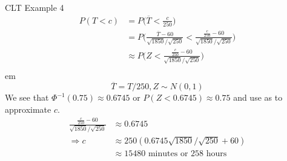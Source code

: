 \documentclass[t,handout]{beamer}
\begin{document}
\begin{frame}{CLT Example 4}
    \begin{align*}
        P(T<c) & = P \bigg( \overline{T} < \frac{c}{250} \bigg) \\
            & = P \bigg( \frac{\overline{T} - 60}{\sqrt{1850}/\sqrt{250}} < \frac{\frac{c}{250}-60}{\sqrt{1850}/\sqrt{250}} \bigg) \\
            & \approx P \bigg( Z < \frac{\frac{c}{250}-60}{\sqrt{1850}/\sqrt{250}} \bigg) \\
    \end{align*}
     em
    $$\overline{T} = T/250, Z\sim N(0,1)$$
    We see that $\Phi^{-1}(0.75) \approx 0.6745$ or $P(Z< 0.6745)\approx 0.75$ and use as to approximate $c$.
    \begin{align*}
        \frac{\frac{c}{250}-60}{\sqrt{1850}/\sqrt{250}} & \approx 0.6745\\
        \Rightarrow c & \approx 250(0.6745 \sqrt{1850}/\sqrt{250} + 60) \\
        &  \approx 15480 \text{ minutes or } 258 \text{ hours}
    \end{align*}
\end{frame}
\end{document}
